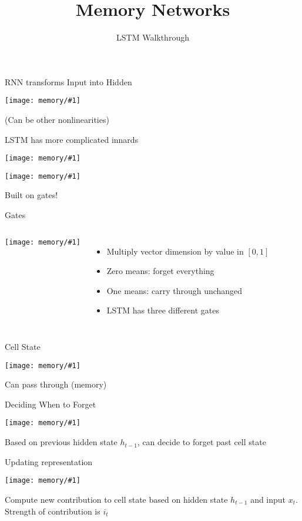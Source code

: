 \documentclass[compress]{beamer}
\title{Memory Networks}
\date{LSTM Walkthrough}
\newcommand{\gfx}[2]{
\begin{center}
	\texttt{[image: memory/\#1]}
\end{center}
}
\begin{document}


\begin{frame}{RNN transforms Input into Hidden}

  \gfx{LSTM3-SimpleRNN}{.9}

  (Can be other nonlinearities)

\end{frame}

\begin{frame}{LSTM has more complicated innards}

  \gfx{LSTM3-chain}{.9}
  \gfx{LSTM2-notation}{.8}
  \pause
  Built on gates!

\end{frame}


\begin{frame}{Gates}

\begin{columns}
  \gfx{LSTM3-gate}{.7}
  \begin{itemize}
    \item Multiply vector dimension by value in $[0,1]$
    \item Zero means: forget everything
    \item One means: carry through unchanged
    \item LSTM has three different gates
  \end{itemize}
\end{columns}

\end{frame}


\begin{frame}{Cell State}

  \gfx{LSTM3-C-line}{.9}
  Can pass through (memory)
\end{frame}

\begin{frame}{Deciding When to Forget}

  \gfx{LSTM3-focus-f}{.9}

  Based on previous hidden state $h_{t-1}$, can decide to forget past cell state

\end{frame}

\begin{frame}{Updating representation}

  \gfx{LSTM3-focus-i}{.9}

  Compute new contribution to cell state based on hidden state
  $h_{t-1}$ and input $x_t$.  Strength of contribution is $i_t$

\end{frame}
\end{document}
